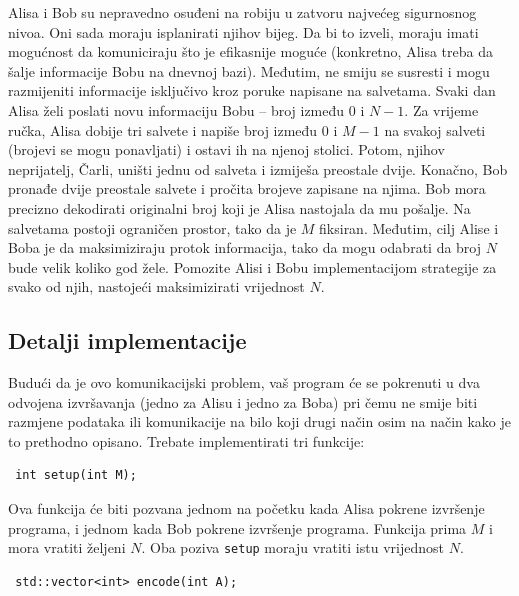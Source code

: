 \documentclass[12pt]{article}
\begin{document}
\renewcommand{\round}{Day 1}
\renewcommand{\problemName}{Zadatak Zatvor}
\renewcommand{\lang}{Bosanski}

\renewcommand{\tl}{$2$ sek.}
\renewcommand{\ml}{$1024$ MB}
\problem{\problemName}

Alisa i Bob su nepravedno osuđeni na robiju u zatvoru najvećeg sigurnosnog nivoa. Oni sada moraju isplanirati njihov bijeg. Da bi to izveli, moraju imati mogućnost da komuniciraju što je efikasnije moguće (konkretno, Alisa treba da šalje informacije Bobu na dnevnoj bazi). Međutim, ne smiju se susresti i mogu razmijeniti informacije isključivo kroz poruke napisane na salvetama. Svaki dan Alisa želi poslati novu informaciju Bobu -- broj između $0$ i $N-1$. Za vrijeme ručka, Alisa dobije tri salvete i napiše broj između $0$ i $M-1$ na svakoj salveti (brojevi se mogu ponavljati) i ostavi ih na njenoj stolici. Potom, njihov neprijatelj, Čarli, uništi jednu od salveta i izmiješa preostale dvije. Konačno, Bob pronađe dvije preostale salvete i pročita brojeve zapisane na njima. Bob mora precizno dekodirati originalni broj koji je Alisa nastojala da mu pošalje. Na salvetama postoji ograničen prostor, tako da je $M$ fiksiran. Međutim, cilj Alise i Boba je da maksimiziraju protok informacija, tako da mogu odabrati da broj $N$ bude velik koliko god žele. Pomozite Alisi i Bobu implementacijom strategije za svako od njih, nastojeći maksimizirati vrijednost $N$.

\subsection{Detalji implementacije}
Budući da je ovo komunikacijski problem, vaš program će se pokrenuti u dva odvojena izvršavanja (jedno za Alisu i jedno za Boba) pri čemu ne smije biti razmjene podataka ili komunikacije na bilo koji drugi način osim na način kako je to prethodno opisano. Trebate implementirati tri funkcije:

\begin{lstlisting}
 int setup(int M);
\end{lstlisting}

Ova funkcija će biti pozvana jednom na početku kada Alisa pokrene izvršenje programa, i jednom kada Bob pokrene izvršenje programa. Funkcija prima $M$ i mora vratiti željeni $N$. Oba poziva \texttt{setup} moraju vratiti istu vrijednost $N$.

\begin{lstlisting}
 std::vector<int> encode(int A);
\end{lstlisting}
\end{document}

